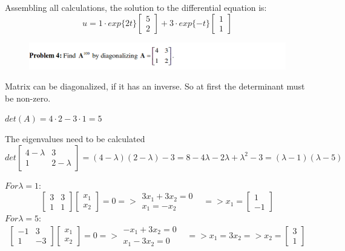 \documentclass[eng,openany]{mgr}
\begin{document}
Assembling all calculations, the solution to the differential equation is:
\[
u = 1\cdot exp\{2t\}
\begin{bmatrix}
5\\2
\end{bmatrix}
+
3\cdot exp\{-t\}
\begin{bmatrix}
1\\1
\end{bmatrix}
\]
\newpage
\begin{figure}[h]
\centering
\includegraphics[width=0.8\linewidth]{screenshot005}
\label{fig:screenshot005}
\end{figure}
Matrix can be diagonalized, if it has an inverse. So at first the determinant must be non-zero.

$det(A) = 4\cdot2 - 3\cdot1 = 5$

The eigenvalues need to be calculated
\[
det
\begin{bmatrix}
4-\lambda&3\\
1 & 2-\lambda
\end{bmatrix}
= (4-\lambda)(2-\lambda)-3 = 8 - 4\lambda -2\lambda + \lambda^2 -3 = (\lambda-1)(\lambda-5)
\] 

$For \lambda=1$:
\[
\begin{bmatrix}
3 & 3\\
1 & 1
\end{bmatrix}
\begin{bmatrix}
x_1\\
x_2
\end{bmatrix}
= 0 =>
\begin{matrix}
3x_1 + 3x_2 = 0&\\
x_1 = -x_2&
\end{matrix}
=> x_1 =
\begin{bmatrix}
1\\
-1
\end{bmatrix}
\]
$For \lambda=5$:
\[
\begin{bmatrix}
-1 & 3\\
1 & -3
\end{bmatrix}
\begin{bmatrix}
x_1\\
x_2
\end{bmatrix}
= 0 =>
\begin{matrix}
-x_1 + 3x_2 = 0&\\
x_1 - 3x_2 = 0&
\end{matrix}
=> x_1 = 3x_2
=>
x_2=
\begin{bmatrix}
3\\
1
\end{bmatrix}
\]
\end{document}
